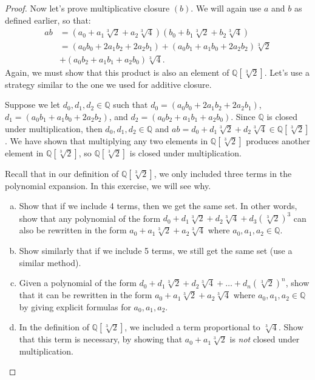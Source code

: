 \begin{example}
\begin{proof}
Now let's prove multiplicative closure $(b)$.
We will again use $a$ and $b$ as defined earlier, so that: 
\begin{align*}
ab&=(a_0+a_1\sqrt[3]{2}+a_2\sqrt[3]{4})(b_0+b_1\sqrt[3]{2}+b_2\sqrt[3]{4})\\ &=(a_0b_0+2a_1b_2+2a_2b_1)+(a_0b_1+a_1b_0+2a_2b_2)\sqrt[3]{2}\\
& +(a_0b_2+a_1b_1+a_2b_0)\sqrt[3]{4}.
\end{align*}
Again, we must show that this product is also an element of ${\mathbb Q}[\sqrt[3]{2}]$.  Let's use a strategy similar to the one we used for additive closure.

Suppose we let $d_0,d_1,d_2\in{\mathbb Q}$ such that $d_0=(a_0b_0+2a_1b_2+2a_2b_1)$, $d_1=(a_0b_1+a_1b_0+2a_2b_2)$, and $d_2=(a_0b_2+a_1b_1+a_2b_0)$.  Since ${\mathbb Q}$ is closed under multiplication, then $d_0,d_1,d_2\in{\mathbb Q}$ and $ab=d_0+d_1\sqrt[3]{2}+d_2\sqrt[3]{4}\in{\mathbb Q}[\sqrt[3]{2}]$. We have shown that multiplying any two elements in ${\mathbb Q}[\sqrt[3]{2}]$ produces another element in ${\mathbb Q}[\sqrt[3]{2}]$, so ${\mathbb Q}[\sqrt[3]{2}]$ is closed under multiplication.\\

\begin{exercise}\label{exercise:rings:threeTermsofQring}
Recall that in our definition of ${\mathbb Q}[\sqrt[3]{2}]$, we only included three terms in the polynomial expansion. In this exercise, we will see why. 
\begin{enumerate}[(a)]
\item Show that if we include 4 terms, then we get the same set. In other words, show that any polynomial of the form $d_0+d_1\sqrt[3]{2}+d_2\sqrt[3]{4}+d_3(\sqrt[3]{2})^3$ can also be rewritten in the form $a_0+a_1\sqrt[3]{2}+a_2\sqrt[3]{4}$ where $a_0, a_1, a_2  \in {\mathbb Q}$.
\item
Show similarly that if we include 5 terms, we still get the same set (use a similar method).
\item
Given a polynomial of the form $d_0+d_1\sqrt[3]{2}+d_2\sqrt[3]{4}+ \ldots + d_n(\sqrt[3]{2})^n$, show that it can be rewritten in the form $a_0+a_1\sqrt[3]{2}+a_2\sqrt[3]{4}$ where $a_0, a_1, a_2  \in {\mathbb Q}$ by giving explicit formulas for $a_0, a_1, a_2$.
\item
In the definition of ${\mathbb Q}[\sqrt[3]{2}]$, we included a term proportional to $\sqrt[3]{4}$.  Show that this term is necessary, by showing that $a_0+a_1\sqrt[3]{2}$ is \emph{not} closed under multiplication.
\end{enumerate}
\end{exercise}


\end{proof}
\end{example}
